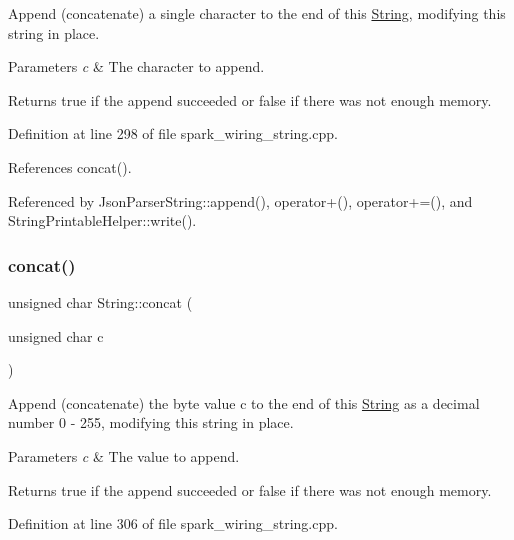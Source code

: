 Append (concatenate) a single character to the end of this \hyperlink{class_string}{String}, modifying this string in place. 


\begin{DoxyParams}{Parameters}
{\em c} & The character to append.\\
\hline
\end{DoxyParams}
\begin{DoxyReturn}{Returns}
true if the append succeeded or false if there was not enough memory. 
\end{DoxyReturn}


Definition at line 298 of file spark\+\_\+wiring\+\_\+string.\+cpp.



References concat().



Referenced by Json\+Parser\+String\+::append(), operator+(), operator+=(), and String\+Printable\+Helper\+::write().

\mbox{\label{class_string_a1c02b2de34a3245d16c5430951789f7d}} 
\subsubsection{\texorpdfstring{concat()}{concat()}\hspace{0.1cm}{\footnotesize\ttfamily [5/12]}}
{\footnotesize\ttfamily unsigned char String\+::concat (\begin{DoxyParamCaption}\item[{unsigned char}]{c }\end{DoxyParamCaption})}



Append (concatenate) the byte value c to the end of this \hyperlink{class_string}{String} as a decimal number 0 -\/ 255, modifying this string in place. 


\begin{DoxyParams}{Parameters}
{\em c} & The value to append.\\
\hline
\end{DoxyParams}
\begin{DoxyReturn}{Returns}
true if the append succeeded or false if there was not enough memory. 
\end{DoxyReturn}


Definition at line 306 of file spark\+\_\+wiring\+\_\+string.\+cpp.



